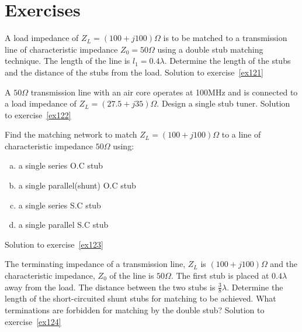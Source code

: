 \section*{Exercises}
\begin{ExerciseList}
\Exercise[label={ex121}]
A load impedance of $Z_{L} = (100 + j100)\Omega$ is to be matched to a transmission line of characteristic impedance $Z_0 = 50\Omega$ using a double stub matching technique. The length of the line is $l_{1} = 0.4\lambda$. Determine the length of the stubs and the distance of the stubs from the load.
\Answer[ref={ex121}]
Solution to exercise~\ref{ex121}

\Exercise[label={ex122}]
A $50\varOmega$ transmission line with an air core operates at 100MHz and is connected to a load impedance of $Z_L = (27.5 + j35)\varOmega$. Design a single stub tuner.
\Answer[ref={ex122}]
Solution to exercise~\ref{ex122}

\Exercise[label={ex123}]
Find the matching network to match $Z_L = (100 + j100)\varOmega$ to a line of characteristic impedance $50\varOmega$ using:
\begin{enumerate}[(a)]
\item a single series O.C stub
\item a single parallel(shunt) O.C stub
\item a single series S.C stub
\item a single parallel S.C stub
\end{enumerate}
\Answer[ref={ex123}]
Solution to exercise~\ref{ex123}

\Exercise[label={ex124}]
The terminating impedance of a transmission line, $Z_L$ is $(100 + j100)\varOmega$ and the characteristic impedance, $Z_0$ of the line is  $50\varOmega$. The first stub is placed at $0.4\lambda$ away from the load. The distance between the two stubs is $\frac{3}{8}\lambda$. Determine the length of the short-circuited shunt stubs for matching to be achieved. What terminations are forbidden for matching by the double stub?
\Answer[ref={ex124}]
Solution to exercise~\ref{ex124}


\end{ExerciseList}
